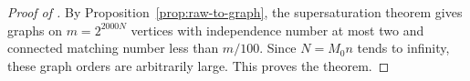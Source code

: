 \begin{proof}[Proof of ]
By Proposition~\ref{prop:raw-to-graph}, the supersaturation theorem gives graphs on \(m=2^{2000N}\) vertices with independence number at
most two and connected matching number less than \(m/100\).
Since \(N=M_0n\) tends to infinity, these graph orders are arbitrarily
large. This proves the theorem.
\end{proof}
